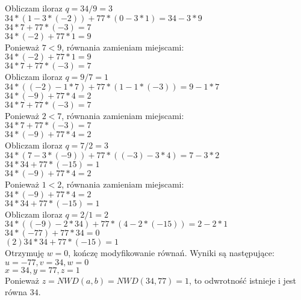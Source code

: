 \documentclass[answers,11pt]{exam}
\begin{document}
\begin{questions}
\begin{solution}
Obliczam iloraz $q = 34 / 9 = 3$\\
$ 34 * (1 - 3 * (-2)) + 77 * (0 - 3 * 1) = 34  - 3 * 9$\\
$ 34 * 7 + 77 * (-3) = 7$\\
$ 34 * (-2) + 77 * 1 = 9$\\

Ponieważ $7 < 9$, równania zamieniam miejscami:\\
$ 34 * (-2) + 77 * 1 = 9$\\
$ 34 * 7 + 77 * (-3) = 7$\\

Obliczam iloraz $q = 9 / 7 = 1$\\
$ 34 * ((-2) - 1 * 7) + 77 * (1 - 1 * (-3)) = 9 - 1 * 7$\\
$ 34 * (-9) + 77 * 4 = 2$\\
$ 34 * 7 + 77 * (-3) = 7$\\

Ponieważ $2 < 7$, równania zamieniam miejscami:\\
$ 34 * 7 + 77 * (-3) = 7$\\
$ 34 * (-9) + 77 * 4 = 2$\\

Obliczam iloraz $q = 7 / 2 = 3$\\
$ 34 * (7 - 3 * (-9)) + 77 * ((-3) - 3 * 4) = 7 - 3 * 2$\\
$ 34 * 34 + 77 * (-15) = 1$\\
$ 34 * (-9) + 77 * 4 = 2$\\
Ponieważ $1 < 2$, równania zamieniam miejscami:\\
$ 34 * (-9) + 77 * 4 = 2$\\
$ 34 * 34 + 77 * (-15) = 1$\\

Obliczam iloraz $q = 2 / 1 = 2$\\
$ 34 * ((-9) - 2 * 34)  + 77 * (4 - 2 * (-15)) = 2 - 2 * 1$\\
$ 34 * (-77) + 77 * 34 = 0$\\
$(2) 34 * 34 + 77 * (-15) = 1$\\

Otrzymuję $w = 0$, kończę modyfikowanie równań. Wyniki są następujące:\\
$u = -77,  v = 34,  w = 0$\\
$x = 34, y = 77,  z = 1$\\

Ponieważ $z = NWD(a,b) = NWD(34,77) = 1$, to odwrotność istnieje i jest równa $34$.\\


\end{solution}
\end{questions}
\end{document}
